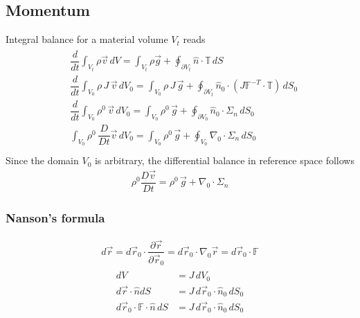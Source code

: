 \documentclass[letterpaper,10pt,english]{jupyterBook}
\begin{document}
\subsection{Momentum}
\label{\detokenize{ch/continuum/balance-reference-integral:momentum}}\label{\detokenize{ch/continuum/balance-reference-integral:continuum-governing-equations-reference-integral-momentum}}
\sphinxAtStartPar
Integral balance for a material volume \(V_t\) reads
\begin{equation*}
\begin{split}\begin{aligned}
  & \dfrac{d}{dt}\int_{V_t} \rho \vec{v} \, dV = \int_{V_t} \rho \vec{g} + \oint_{\partial V_t} \hat{n} \cdot \mathbb{T} \, dS \\
  & \dfrac{d}{dt}\int_{V_0} \rho \, J \, \vec{v} \, dV_0 = \int_{V_0} \rho \, J \, \vec{g} + \oint_{\partial V_t} \hat{n}_0 \cdot \left( J \mathbb{F}^{-T} \cdot \mathbb{T} \right) \, d S_0 \\
  & \dfrac{d}{dt}\int_{V_0} \rho^0 \, \vec{v} \, dV_0 = \int_{V_0} \rho^0 \, \vec{g} + \oint_{\partial V_0} \hat{n}_0 \cdot \mathbb{\Sigma}_n \, d S_0 \\
  & \int_{V_0} \rho^0 \, \dfrac{D}{Dt} \vec{v} \, dV_0 = \int_{V_0} \rho^0 \, \vec{g} + \oint_{V_0} \nabla_0 \cdot \mathbb{\Sigma}_n \, d S_0 \\
\end{aligned}\end{split}
\end{equation*}
\sphinxAtStartPar
Since the domain \(V_0\) is arbitrary, the differential balance in reference space follows
\begin{equation*}
\begin{split}\rho^0 \dfrac{D \vec{v}}{D t} = \rho^0 \, \vec{g} + \nabla_0 \cdot \mathbb{\Sigma}_n\end{split}
\end{equation*}\subsubsection*{Nanson’s formula}
\begin{equation*}
\begin{split}d \vec{r} = d \vec{r}_0 \cdot \dfrac{\partial \vec{r}}{\partial \vec{r}_0} = d \vec{r}_0 \cdot \nabla_0 \vec{r} = d \vec{r}_0 \cdot \mathbb{F}\end{split}
\end{equation*}\begin{equation*}
\begin{split}\begin{aligned}
  dV & = J \, dV_0 \\
  d \vec{r} \cdot \hat{n} dS & = J \, d \vec{r}_0 \cdot \hat{n}_0 \, dS_0 \\
  d \vec{r}_0 \cdot \mathbb{F} \cdot \hat{n} \, dS & = J \, d \vec{r}_0 \cdot \hat{n}_0 \, dS_0 \\
\end{aligned}\end{split}
\end{equation*}
\end{document}
